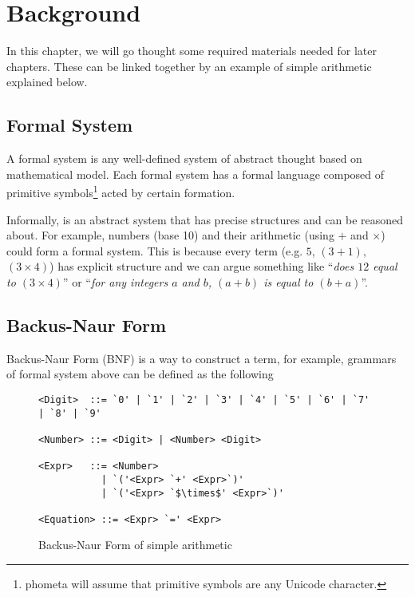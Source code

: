\documentclass[master.tex]{subfiles}
\begin{document}
\chapter{Background}
\label{chap:background}

In this chapter, we will go thought some required materials needed for later
chapters. These can be linked together by an example of simple arithmetic
explained below.

\section{Formal System}

A formal system is any well-defined system of abstract thought based on
mathematical model\supercite{formal-system-wiki}. Each formal system has a
formal language composed of primitive symbols\footnote{phometa will assume that
  primitive symbols are any Unicode character.} acted by certain
formation\supercite{formal-system-britannica}.

Informally, is an abstract system that has precise structures and can be
reasoned about. For example, numbers (base 10) and their arithmetic (using $+$
and $\times$) could form a formal system. This is because every term (e.g. $5$,
$(3 + 1)$, $(3 \times 4)$) has explicit structure and we can argue something
like ``\emph{does $12$ equal to $(3 \times 4)$}'' or ``\emph{for any integers
  $a$ and $b$, $(a + b)$ is equal to $(b + a)$}''.

\section{Backus-Naur Form}

Backus-Naur Form (BNF) is a way to construct a term, for example, grammars of
formal system above can be defined as the following

\begin{figure}[H]
\begin{framed}
\begin{lstlisting}[style=bnf]
<Digit>  ::= `0' | `1' | `2' | `3' | `4' | `5' | `6' | `7' | `8' | `9'

<Number> ::= <Digit> | <Number> <Digit>

<Expr>   ::= <Number>
           | `('<Expr> `+' <Expr>`)'
           | `('<Expr> `$\times$' <Expr>`)'

<Equation> ::= <Expr> `=' <Expr>
\end{lstlisting}
\end{framed}
\caption{Backus-Naur Form of simple arithmetic}
\label{fig:background-bnf}
\end{figure}
\end{document}
